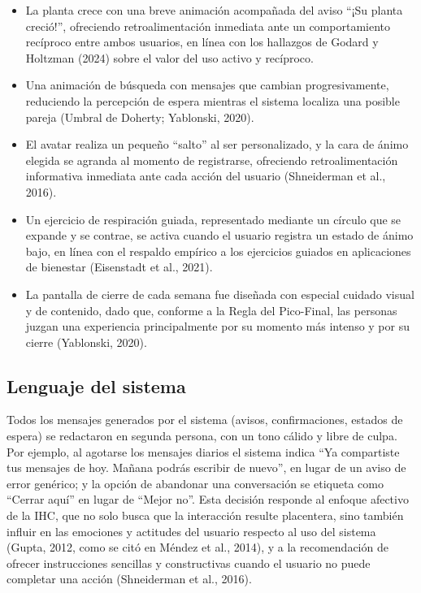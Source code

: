 \begin{itemize}
    \item La planta crece con una breve animación acompañada del aviso ``¡Su planta creció!'', ofreciendo retroalimentación inmediata ante un comportamiento recíproco entre ambos usuarios, en línea con los hallazgos de Godard y Holtzman (2024) sobre el valor del uso activo y recíproco.
    \item Una animación de búsqueda con mensajes que cambian progresivamente, reduciendo la percepción de espera mientras el sistema localiza una posible pareja (Umbral de Doherty; Yablonski, 2020).
    \item El avatar realiza un pequeño ``salto'' al ser personalizado, y la cara de ánimo elegida se agranda al momento de registrarse, ofreciendo retroalimentación informativa inmediata ante cada acción del usuario (Shneiderman et al., 2016).
    \item Un ejercicio de respiración guiada, representado mediante un círculo que se expande y se contrae, se activa cuando el usuario registra un estado de ánimo bajo, en línea con el respaldo empírico a los ejercicios guiados en aplicaciones de bienestar (Eisenstadt et al., 2021).
    \item La pantalla de cierre de cada semana fue diseñada con especial cuidado visual y de contenido, dado que, conforme a la Regla del Pico-Final, las personas juzgan una experiencia principalmente por su momento más intenso y por su cierre (Yablonski, 2020).
\end{itemize}


\subsection{Lenguaje del sistema}
Todos los mensajes generados por el sistema (avisos, confirmaciones, estados de espera) se redactaron en segunda persona, con un tono cálido y libre de culpa. Por ejemplo, al agotarse los mensajes diarios el sistema indica ``Ya compartiste tus mensajes de hoy. Mañana podrás escribir de nuevo'', en lugar de un aviso de error genérico; y la opción de abandonar una conversación se etiqueta como ``Cerrar aquí'' en lugar de ``Mejor no''. Esta decisión responde al enfoque afectivo de la IHC, que no solo busca que la interacción resulte placentera, sino también influir en las emociones y actitudes del usuario respecto al uso del sistema (Gupta, 2012, como se citó en Méndez et al., 2014), y a la recomendación de ofrecer instrucciones sencillas y constructivas cuando el usuario no puede completar una acción (Shneiderman et al., 2016).

